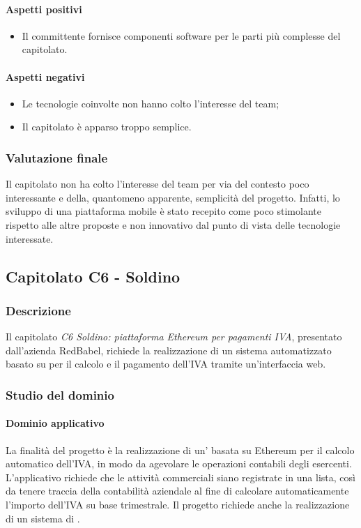 \paragraph{Aspetti positivi}
\begin{itemize}
	\item Il committente fornisce componenti software per le parti più complesse del capitolato.
\end{itemize}
\paragraph{Aspetti negativi}
\begin{itemize}
	\item Le tecnologie coinvolte non hanno colto l'interesse del team;
	\item Il capitolato è apparso troppo semplice.
\end{itemize}
\subsubsection{Valutazione finale}
Il capitolato non ha colto l'interesse del team per via del contesto poco interessante e della, quantomeno apparente, semplicità del progetto. Infatti, lo 				sviluppo di una piattaforma mobile è stato recepito come poco stimolante rispetto alle altre proposte e non innovativo dal punto di vista delle tecnologie 					interessate. 
		
		
	\subsection{Capitolato C6 - Soldino}
		\subsubsection{Descrizione}
		Il capitolato \emph{C6 Soldino: piattaforma Ethereum per pagamenti IVA}, presentato dall'azienda RedBabel, richiede la realizzazione di un sistema automatizzato basato su  per il calcolo e il pagamento dell'IVA tramite un'interfaccia web.
		\subsubsection{Studio del dominio}
			\paragraph{Dominio applicativo} \Spazio
			La finalità del progetto è la realizzazione di un' basata su Ethereum per il calcolo automatico dell'IVA, in modo da agevolare le operazioni contabili degli esercenti. L'applicativo richiede che le attività commerciali siano registrate in una lista, così da tenere traccia della contabilità aziendale al fine di calcolare automaticamente l'importo dell'IVA su base trimestrale. Il progetto richiede anche la realizzazione di un sistema di .
			

